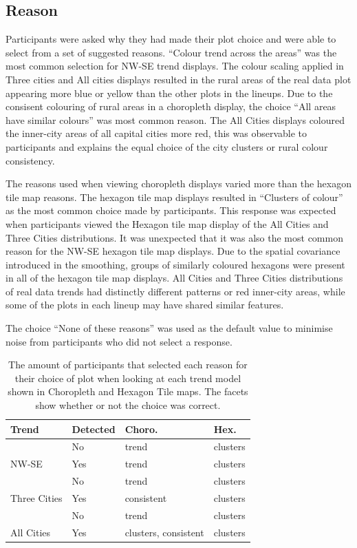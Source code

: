 \documentclass[conference,final,]{IEEEtran}
\begin{document}
\hypertarget{reason}{%
\subsection{Reason}\label{reason}}

Participants were asked why they had made their plot choice and were able to select from a set of suggested reasons.
``Colour trend across the areas'' was the most common selection for NW-SE trend displays.
The colour scaling applied in Three cities and All cities displays resulted in the rural areas of the real data plot appearing more blue or yellow than the other plots in the lineups.
Due to the consisent colouring of rural areas in a choropleth display, the choice ``All areas have similar colours'' was most common reason. The All Cities displays coloured the inner-city areas of all capital cities more red, this was observable to participants and explains the equal choice of the city clusters or rural colour consistency.

The reasons used when viewing choropleth displays varied more than the hexagon tile map reasons.
The hexagon tile map displays resulted in ``Clusters of colour'' as the most common choice made by participants.
This response was expected when participants viewed the Hexagon tile map display of the All Cities and Three Cities distributions. It was unexpected that it was also the most common reason for the NW-SE hexagon tile map displays.
Due to the spatial covariance introduced in the smoothing, groups of similarly coloured hexagons were present in all of the hexagon tile map displays. All Cities and Three Cities distributions of real data trends had distinctly different patterns or red inner-city areas, while some of the plots in each lineup may have shared similar features.

The choice ``None of these reasons'' was used as the default value to minimise noise from participants who did not select a response.

\begin{table}

\caption{\label{tab:reason}The amount of participants that selected each reason for their choice of plot when looking at each trend model shown in Choropleth and Hexagon Tile maps. The facets show whether or not the choice was correct.}
\centering
\begin{tabular}[t]{llll}
\toprule
Trend & Detected & Choro. & Hex.\\
\midrule
 & No & trend & clusters\\
\cmidrule{2-4}
\multirow{-2}{*}{\raggedright\arraybackslash NW-SE} & Yes & trend & clusters\\
\cmidrule{1-4}
 & No & trend & clusters\\
\cmidrule{2-4}
\multirow{-2}{*}{\raggedright\arraybackslash Three Cities} & Yes & consistent & clusters\\
\cmidrule{1-4}
 & No & trend & clusters\\
\cmidrule{2-4}
\multirow{-2}{*}{\raggedright\arraybackslash All Cities} & Yes & clusters, consistent & clusters\\
\bottomrule
\end{tabular}
\end{table}
\end{document}
